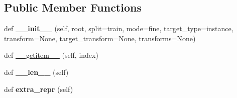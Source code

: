 \subsection*{Public Member Functions}
\begin{DoxyCompactItemize}
\item 
\mbox{\label{classtorchvision_1_1datasets_1_1cityscapes_1_1Cityscapes_a676062dab0ebf6cf17f1f1fe255fca8d}} 
def {\bfseries \+\_\+\+\_\+init\+\_\+\+\_\+} (self, root, split=\textquotesingle{}train\textquotesingle{}, mode=\textquotesingle{}fine\textquotesingle{}, target\+\_\+type=\textquotesingle{}instance\textquotesingle{}, transform=None, target\+\_\+transform=None, transforms=None)
\item 
def \hyperlink{classtorchvision_1_1datasets_1_1cityscapes_1_1Cityscapes_ac445ee4a51a6c6110dfc6d86f52cf0bf}{\+\_\+\+\_\+getitem\+\_\+\+\_\+} (self, index)
\item 
\mbox{\label{classtorchvision_1_1datasets_1_1cityscapes_1_1Cityscapes_a9fc3527aa52824fc12875277f2c2187e}} 
def {\bfseries \+\_\+\+\_\+len\+\_\+\+\_\+} (self)
\item 
\mbox{\label{classtorchvision_1_1datasets_1_1cityscapes_1_1Cityscapes_aa831a13d0b1aae63ef1c5041fa32301a}} 
def {\bfseries extra\+\_\+repr} (self)
\end{DoxyCompactItemize}
